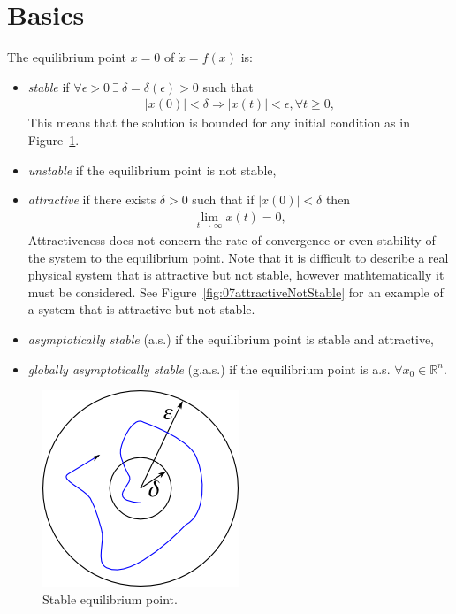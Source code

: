 \mainmatter%
\setcounter{page}{1}

\lectureseries[\course]{\course}

\date{January 26, 2010}

\setaddress%

\setcounter{lecture}{6}
\setcounter{chapter}{6}


\section{Basics}
\begin{definition}
The equilibrium point $x=0$ of $\dot{x}=f(x)$ is:
\begin{itemize}
\item \textit{stable} if $\forall \epsilon > 0~\exists~\delta=\delta(\epsilon)>0$ such that
\begin{align*}
|x(0)| < \delta \Rightarrow |x(t)| < \epsilon, \forall t\geq0,
\end{align*}
This means that the solution is bounded for any initial condition as in Figure~\ref{fig:07stableEqPoint}.
\item \textit{unstable} if the equilibrium point is not stable,
\item \textit{attractive} if there exists $\delta>0$ such that if $|x(0)|<\delta$ then
\begin{align*}
\lim_{t\to\infty}x(t) = 0,
\end{align*}
Attractiveness does not concern the rate of convergence or even stability of the system to the equilibrium point.
Note that it is difficult to describe a real physical system that is attractive but not stable, however mathtematically it must be considered.
See Figure~\ref{fig:07attractiveNotStable} for an example of a system that is attractive but not stable.
\item \textit{asymptotically stable} (a.s.) if the equilibrium point is stable and attractive,
\item \textit{globally asymptotically stable} (g.a.s.) if the equilibrium point is a.s. $\forall x_0\in\mathbb{R}^n$.
\end{itemize}
\end{definition}

\begin{figure}[ht!]
\centering
\includegraphics[width=.4\textwidth]{images/07stableEqPoint}
\caption{Stable equilibrium point.}
\label{fig:07stableEqPoint}
\end{figure}

